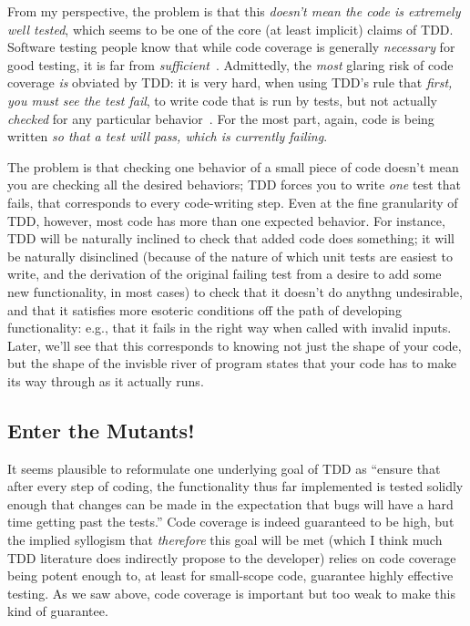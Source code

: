 \documentclass[sigplan,screen]{acmart}
\begin{document}
From my perspective, the problem is that this \emph{doesn't mean the
  code is extremely well tested}, which seems to be one of the core
(at least implicit) claims of TDD.  Software testing people know that
while code coverage is generally \emph{necessary} for good testing, it
is far from \emph{sufficient}~\cite{Discontents,CleanCode}.  Admittedly, the \emph{most} glaring risk of code
coverage \emph{is} obviated by TDD:  it is very hard, when using TDD's
rule that \emph{first, you must see the test fail}, to write code
that is run by tests, but not actually \emph{checked} for any
particular behavior~\cite{Schuler2011AssessingOQ}.  For the most part,
again, code is being written \emph{so that a test will pass, which is
  currently failing}.

The problem is that checking one behavior of a small piece of code
doesn't mean you are checking all the desired behaviors; TDD forces
you to write \emph{one} test that fails, that corresponds to every
code-writing step.  Even at the fine granularity of TDD, however, most
code has more than one expected behavior.  For instance, TDD will be
naturally inclined to check that added code does something; it will be
naturally disinclined (because of the nature of which unit tests are
easiest to write, and the
derivation of the original failing test from a desire to add some new
functionality, in most cases) to check that it doesn't do anythng
undesirable, and that it satisfies more esoteric conditions off the
path of developing functionality: e.g., that it fails in the right way when called with
invalid inputs.  Later, we'll see that this corresponds to knowing not
just the shape of your code, but the shape of the invisble river of program
states that your code has to make its way through as it actually runs.

\subsection{Enter the Mutants!}

It seems plausible to reformulate one underlying goal of TDD as
``ensure that after every step of coding, the functionality thus far
implemented is tested solidly enough that changes can be made in the
expectation that bugs will have a hard time getting past the tests.''
Code coverage is indeed guaranteed to be high, but the implied syllogism that
\emph{therefore} this goal will be met (which I think much TDD
literature does indirectly propose to the developer) relies on code coverage being potent
enough to, at least for small-scope code, guarantee highly effective
testing.  As we saw above, code coverage is important but too weak to
make this kind of guarantee.
\end{document}
